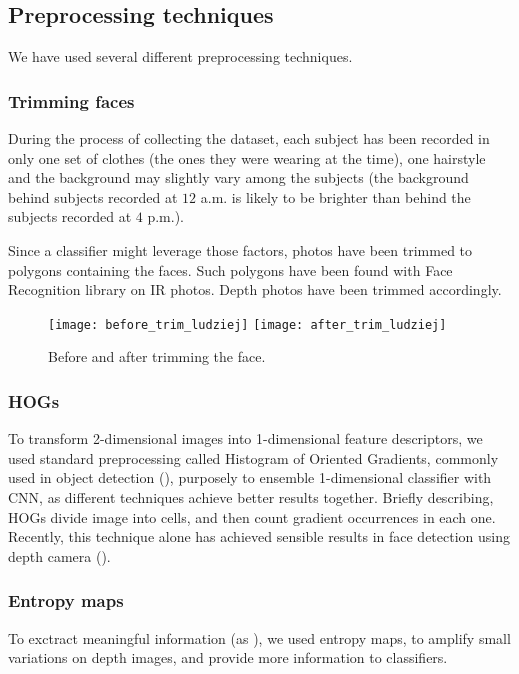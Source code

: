     \subsection{Preprocessing techniques}
    We have used several different preprocessing techniques.
        \subsubsection*{Trimming faces}
        \label{sec:trimming}
        During the process of collecting the dataset, each subject has been
        recorded in only one set of clothes (the ones they were wearing at the
        time), one hairstyle and the background may slightly vary among the
        subjects (the background behind subjects recorded at $12$ a.m. is
        likely to be brighter than behind the subjects recorded at $4$ p.m.).

        Since a classifier might leverage those factors, photos have been
        trimmed to polygons containing the faces. Such polygons have been
        found with Face Recognition library \cite{facerecog} on IR photos.
        Depth photos have been trimmed accordingly.

        \begin{figure}[H]
        \caption{Before and after trimming the face.}
        \centering
        \texttt{[image: before\_trim\_ludziej]}
        \texttt{[image: after\_trim\_ludziej]}
        \end{figure}

        \subsubsection*{HOGs}
        To transform 2-dimensional images into 1-dimensional feature descriptors,
        we used standard preprocessing called Histogram of Oriented Gradients, commonly used in
        object detection (\citeauthor{hog}), purposely to ensemble 1-dimensional classifier with CNN,
        as different techniques achieve better results together. Briefly describing,
        HOGs divide image into cells, and then count gradient occurrences in each one.
        Recently, this technique alone has achieved sensible results in face detection using depth camera (\citeauthor{rgbdhog}).

        \subsubsection*{Entropy maps}
        To exctract meaningful information (as \citeauthor{rgbdhog}),
        we used entropy maps, to amplify small variations on depth images, and provide
        more information to classifiers.

